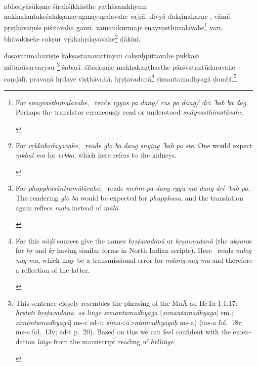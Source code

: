 \documentclass[naipra.tex]{subfiles}
\begin{document}
\begin{sanskrit}
\pstart
abhedyāsūkṣme śiraḥśikhāsthe yathāsaṃkhyaṃ nakhadantakeśalakṣaṇayugmayugalavahe vajrā. 
divyā dakṣiṇakarṇe , vāmā pṛṣṭhavaṃśe piśitavahā gaurī. 
vāmanīkūrmaje  snāyvasthimālāvahe\footnote{
	\begin{english}%
		For \emph{snāyvasthimālāvahe}, \TIB\ reads \emph{rgyus pa dang/ rus pa dang/ dri 'bab ba dag}.
		Perhaps the translator erroneously read or understood \emph{snāyvasthimalāvahe}.
	\end{english}
} vārī. 
bhāvakīseke cakṣur vṛkkahṛdayavahe\footnote{
	\begin{english}%
		For \emph{vṛkkahṛdayavahe}, \TIB\ reads \emph{glo ba dang snying 'bab pa ste}.
		One would expect \emph{mkhal ma} for \emph{vṛkka}, which here refers to the kidneys.
	\end{english}
} ḍākinī. 
\pend

\pstart
doṣāvatīmahāviṣṭe kakṣastanavartinyau cakṣuḥpittavahe pukkasī.
mātarāsarvaryau  \footnote{
	\begin{english}%
		For \emph{phupphusāntramālāvahe}, \TIB\ reads \emph{mchin pa dang rgyu ma dang dri 'bab pa}.
		The rendering \emph{glo ba} would be expected for \emph{phupphusa}, and the translation again reflecs \emph{mala} instead of \emph{mālā}.
	\end{english}
} śabarī.
śītadoṣme mukhakaṇṭhasthe pārśvatantūdaravahe caṇḍālī. 
pravaṇā hṛdaye viṣṭhāvahā, hṛṣṭavadanā\footnote{
	\begin{english}%
		For this \emph{nāḍī} sources give the names \emph{hṛṣṭavadanā} or \emph{kṛṣṇavadanā} (the \emph{akṣara}s for \emph{hṛ} and \emph{kṛ} having similar forms in North Indian scripts).
		Here \TIB\ reads \emph{mdog nag ma}, which may be a transmissional error for \emph{mdong nag ma} and therefore a reflection of the latter.
	\end{english}
}  sīmantamadhyagā ḍombī.\footnote{
	\begin{english}%
		This sentence closely resembles the phrasing of the MuĀ ad HeTa 1.1.17: \emph{hṛṣṭeti hṛṣṭavadanā. sā liṅge sīmantamadhyagā} (\emph{sīmantamadhyagā}] em.; \emph{sīmāntamadhyagā}] ms-c ed-t; \emph{sīma<ā>ntamadhyagāḥ} ms-a) (ms-a fol.\ 18r; ms-c fol.\ 13v; ed-t p.\ 20).
		Based on this we can feel confident with the emendation \emph{liṅge} from the manuscript reading of \emph{hṛlliṅge}.
	\end{english}
}
\pend


\end{sanskrit}
\end{document}
